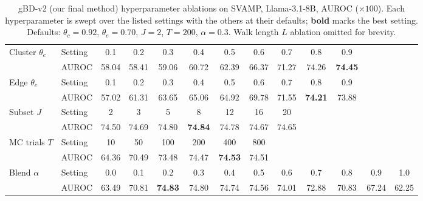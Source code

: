 \documentclass[11pt]{article}
\begin{document}
\begin{table}[htbp]
  \centering
  \footnotesize
  \setlength{\tabcolsep}{4pt}
  \caption{gBD-v2 (our final method) hyperparameter ablations on SVAMP,
  Llama-3.1-8B, AUROC ($\times 100$). Each hyperparameter is swept over the listed
  settings with the others at their defaults; \textbf{bold} marks the best setting.
  Defaults: $\theta_c{=}0.92$, $\theta_e{=}0.70$, $J{=}2$, $T{=}200$,
  $\alpha{=}0.3$. Walk length $L$ ablation omitted for brevity.}
  \label{tab:ablation}
  \begin{tabular}{l l ccccccccccc}
    \toprule
    \multirow{2}{*}{Cluster $\theta_c$} & Setting & 0.1 & 0.2 & 0.3 & 0.4 & 0.5 & 0.6 & 0.7 & 0.8 & 0.9 \\
     & AUROC & 58.04 & 58.41 & 59.06 & 60.72 & 62.39 & 66.37 & 71.27 & 74.26 & \textbf{74.45} \\
    \midrule
    \multirow{2}{*}{Edge $\theta_e$} & Setting & 0.1 & 0.2 & 0.3 & 0.4 & 0.5 & 0.6 & 0.7 & 0.8 & 0.9 \\
     & AUROC & 57.02 & 61.31 & 63.65 & 65.06 & 64.92 & 69.78 & 71.55 & \textbf{74.21} & 73.88 \\
    \midrule
    \multirow{2}{*}{Subset $J$} & Setting & 2 & 3 & 5 & 8 & 12 & 16 & 20 \\
     & AUROC & 74.50 & 74.69 & 74.80 & \textbf{74.84} & 74.78 & 74.67 & 74.65 &  &  &  &  \\
    \midrule
    \multirow{2}{*}{MC trials $T$} & Setting & 10 & 50 & 100 & 200 & 400 & 800 \\
     & AUROC & 64.36 & 70.49 & 73.48 & 74.47 & \textbf{74.53} & 74.51 \\
    \midrule
    \multirow{2}{*}{Blend $\alpha$} & Setting & 0.0 & 0.1 & 0.2 & 0.3 & 0.4 & 0.5 & 0.6 & 0.7 & 0.8 & 0.9 & 1.0 \\
     & AUROC & 63.49 & 70.81 & \textbf{74.83} & 74.80 & 74.74 & 74.56 & 74.01 & 72.88 & 70.83 & 67.24 & 62.25 \\
    \bottomrule
  \end{tabular}
\end{table}
\end{document}
